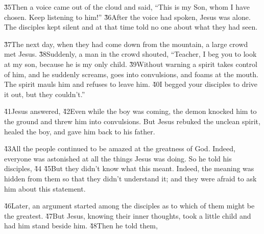 \v{35}Then a voice came out of the cloud and said, ``This is my Son, whom I have chosen. Keep listening to him!'' \v{36}After the voice had spoken, Jesus was alone. The disciples kept silent and at that time told no one about what they had seen.

\v{37}The next day, when they had come down from the mountain, a large crowd met Jesus. \v{38}Suddenly, a man in the crowd shouted, ``Teacher, I beg you to look at my son, because he is my only child. \v{39}Without warning a spirit takes control of him, and he suddenly screams, goes into convulsions, and foams at the mouth. The spirit mauls him and refuses to leave him. \v{40}I begged your disciples to drive it out, but they couldn't.''

\v{41}Jesus answered,  \v{42}Even while the boy was coming, the demon knocked him to the ground and threw him into convulsions. But Jesus rebuked the unclean spirit, healed the boy, and gave him back to his father.

\v{43}All the people continued to be amazed at the greatness of God. Indeed, everyone was astonished at all the things Jesus was doing. So he told his disciples, \v{44} \v{45}But they didn't know what this meant. Indeed, the meaning was hidden from them so that they didn't understand it; and they were afraid to ask him about this statement.

\v{46}Later, an argument started among the disciples as to which of them might be the greatest. \v{47}But Jesus, knowing their inner thoughts, took a little child and had him stand beside him. \v{48}Then he told them, 

